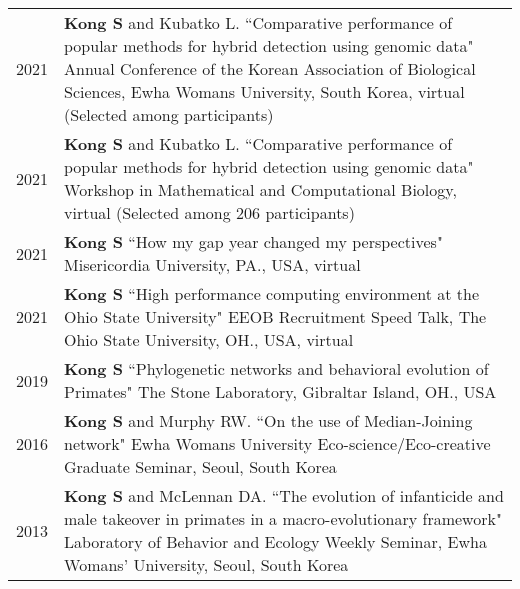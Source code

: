 \documentclass[11pt]{article}
\begin{document}
\begin{longtable}{p{}  p{}}


2021 & \textbf{Kong S} and Kubatko L.  ``Comparative performance of popular methods for hybrid detection using genomic data" Annual Conference of the Korean Association of Biological Sciences, Ewha Womans University, South Korea, virtual (Selected among participants) \vspace{10pt} \\ 

2021 & \textbf{Kong S} and Kubatko L.  ``Comparative performance of popular methods for hybrid detection using genomic data" Workshop in Mathematical and Computational Biology, virtual (Selected among 206 participants)\textit{} \vspace{10pt} \\ 

2021 & \textbf{Kong S} ``How my gap year changed my perspectives" Misericordia University, PA., USA, virtual \vspace{10pt} \\  

2021 & \textbf{Kong S} ``High performance computing environment at the Ohio State University" EEOB Recruitment Speed Talk, The Ohio State University, OH., USA, virtual \vspace{10pt} \\ 

2019 &  \textbf{Kong S} ``Phylogenetic networks and behavioral evolution of Primates" The Stone Laboratory, Gibraltar Island, OH., USA \vspace{10pt} \\ 

2016 & \textbf{Kong S} and Murphy RW. ``On the use of Median-Joining network" Ewha Womans University Eco-science/Eco-creative Graduate Seminar, Seoul, South Korea \vspace{10pt} \\

2013 & \textbf{Kong S} and McLennan DA. ``The evolution of infanticide and male takeover in primates in a macro-evolutionary framework" Laboratory of Behavior and Ecology Weekly Seminar, Ewha Womans’ University, Seoul, South Korea \vspace{10pt} \\ 
\end{longtable}
\end{document}
